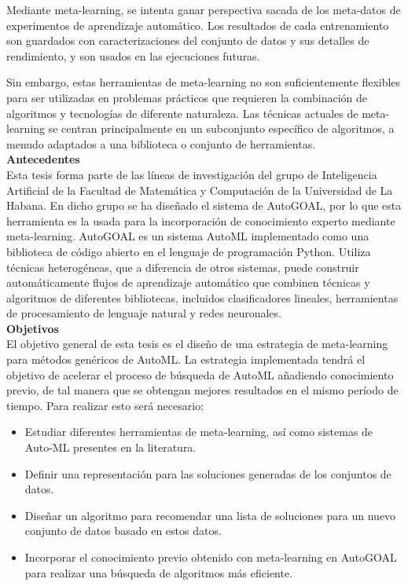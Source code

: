 Mediante meta-learning, se intenta ganar perspectiva sacada de los meta-datos
de experimentos de aprendizaje automático. Los resultados de cada entrenamiento
son guardados con caracterizaciones del conjunto de datos y sus detalles de rendimiento,
y son usados en las ejecuciones futuras.

Sin embargo, estas herramientas de meta-learning no son suficientemente
flexibles para ser utilizadas en problemas prácticos que requieren la
combinación de algoritmos y tecnologías de diferente naturaleza. Las técnicas
actuales de meta-learning se centran principalmente en un subconjunto
específico de algoritmos, a menudo adaptados a una biblioteca o conjunto de
herramientas.\\

\textbf{\Large Antecedentes}\\

Esta tesis forma parte de las líneas de investigación del grupo de Inteligencia
Artificial de la Facultad de Matemática y Computación de la Universidad de La
Habana. En dicho grupo se ha diseñado el sistema de AutoGOAL, por lo que esta
herramienta es la usada para la incorporación de conocimiento experto mediante
meta-learning. AutoGOAL es un sistema AutoML implementado como una biblioteca
de código abierto en el lenguaje de programación Python. Utiliza técnicas
heterogéneas, que a diferencia de otros sistemas, puede construir
automáticamente flujos de aprendizaje automático que combinen técnicas y
algoritmos de diferentes bibliotecas, incluidos clasificadores lineales,
herramientas de procesamiento de lenguaje natural y redes neuronales.\\

\textbf{\Large Objetivos}\\

El objetivo general de esta tesis es el diseño de una estrategia de
meta-learning para métodos genéricos de AutoML. La estrategia implementada
tendrá el objetivo de acelerar el proceso de búsqueda de AutoML añadiendo
conocimiento previo, de tal manera que se obtengan mejores resultados en el
mismo período de tiempo. Para realizar esto será necesario:

\begin{itemize}
    \item Estudiar diferentes herramientas de meta-learning, así como sistemas
    de Auto-ML presentes en la literatura.
    \item Definir una representación para las soluciones generadas de los
    conjuntos de datos.
    \item Diseñar un algoritmo para recomendar una lista de soluciones para un
    nuevo conjunto de datos basado en estos datos.
    \item Incorporar el conocimiento previo obtenido con meta-learning en
    AutoGOAL para realizar una búsqueda de algoritmos más eficiente.
    
\end{itemize}

